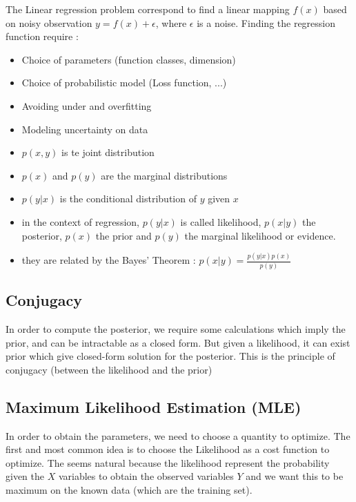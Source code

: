 	The Linear regression problem correspond to find a linear mapping $f(x)$ based on noisy observation $y = f(x) + \epsilon$, where $\epsilon$ is a noise. 
	Finding the regression function require : 
	\begin{itemize}
		\item Choice of parameters (function classes, dimension)
		\item Choice of probabilistic model (Loss function, ...)
		\item Avoiding under and overfitting
		\item Modeling uncertainty on data
	\end{itemize}

	\begin{definition}
			\begin{itemize}
				\item $p(x, y)$ is te joint distribution
				\item $p(x)$ and $p(y)$ are the marginal distributions
				\item $p(y|x)$ is the conditional distribution of $y$ given $x$
			 	\item in the context of regression, $p(y|x)$ is called likelihood, $p(x|y)$ the posterior, $p(x)$ the prior and $p(y)$ the marginal likelihood or evidence.
			 	\item they are related by the Bayes' Theorem : $p(x|y) = \frac{p(y|x)p(x)}{p(y)}$ 
			\end{itemize}
		\end{definition}

	\subsection{Conjugacy} %
	\label{sub:conjugacy}
		In order to compute the posterior, we require some calculations which imply the prior, and can be intractable as a closed form. But given a likelihood, it can exist prior which give closed-form solution for the posterior. This is the principle of conjugacy (between the likelihood and the prior)

	\subsection{Maximum Likelihood Estimation (MLE)}
	In order to obtain the parameters, we need to choose a quantity to optimize. The first and most common idea is to choose the Likelihood as a cost function to optimize. The seems natural because the likelihood represent the probability given the $X$ variables to obtain the observed variables $Y$ and we want this to be maximum on the known data (which are the training set).

